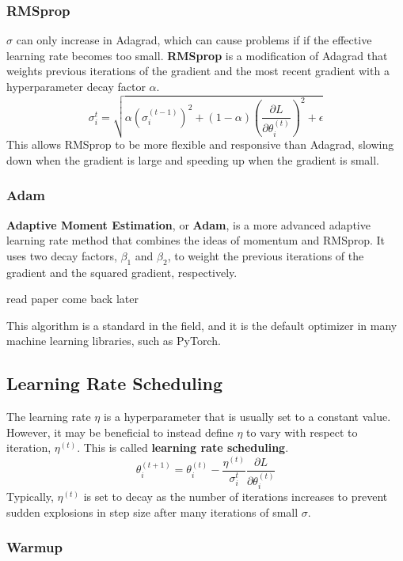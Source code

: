 \documentclass[12pt]{report}
\theoremstyle{definition}
\theoremstyle{remark}
\begin{document}
\subsubsection{RMSprop}
$\sigma$ can only increase in Adagrad, which can cause problems if if the effective learning rate becomes too small. \textbf{RMSprop} is a modification of Adagrad that weights previous iterations of the gradient and the most recent gradient with a hyperparameter decay factor $\alpha$.
\begin{equation}
    \sigma_i^t = \sqrt{\alpha {(\sigma_i^{(t-1)})}^2 + (1-\alpha)\left(\frac{\partial L}{\partial \theta_i^{(t)}}\right)^2 + \epsilon}
\end{equation}
This allows RMSprop to be more flexible and responsive than Adagrad, slowing down when the gradient is large and speeding up when the gradient is small.
\subsubsection{Adam}
\textbf{Adaptive Moment Estimation}, or \textbf{Adam}, is a more advanced adaptive learning rate method that combines the ideas of momentum and RMSprop. It uses two decay factors, $\beta_1$ and $\beta_2$, to weight the previous iterations of the gradient and the squared gradient, respectively.

read paper come back later

This algorithm is a standard in the field, and it is the default optimizer in many machine learning libraries, such as PyTorch.

\subsection{Learning Rate Scheduling}

The learning rate $\eta$ is a hyperparameter that is usually set to a constant value. However, it may be beneficial to instead define $\eta$ to vary with respect to iteration, $\eta^{(t)}$. This is called \textbf{learning rate scheduling}.
\begin{equation}
    \theta_{i}^{(t+1)} = \theta_{i}^{(t)} - \frac{\eta^{(t)}}{\sigma_i^t}\frac{\partial L}{\partial \theta_i^{(t)}}
\end{equation}
Typically, $\eta^{(t)}$ is set to decay as the number of iterations increases to prevent sudden explosions in step size after many iterations of small $\sigma$.

\subsubsection{Warmup}
\end{document}
